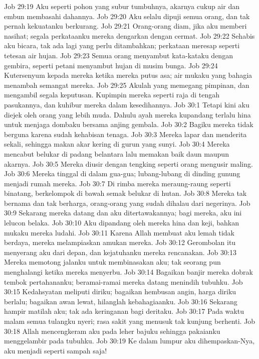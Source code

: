 Job 29:19  Aku seperti pohon yang subur tumbuhnya, akarnya cukup air dan embun membasahi dahannya.
Job 29:20  Aku selalu dipuji semua orang, dan tak pernah kekuatanku berkurang.
Job 29:21  Orang-orang diam, jika aku memberi nasihat; segala perkataanku mereka dengarkan dengan cermat.
Job 29:22  Sehabis aku bicara, tak ada lagi yang perlu ditambahkan; perkataan meresap seperti tetesan air hujan.
Job 29:23  Semua orang menyambut kata-kataku dengan gembira, seperti petani menyambut hujan di musim bunga.
Job 29:24  Kutersenyum kepada mereka ketika mereka putus asa; air mukaku yang bahagia menambah semangat mereka.
Job 29:25  Akulah yang memegang pimpinan, dan mengambil segala keputusan. Kupimpin mereka seperti raja di tengah pasukannya, dan kuhibur mereka dalam kesedihannya.
Job 30:1  Tetapi kini aku diejek oleh orang yang lebih muda. Dahulu ayah mereka kupandang terlalu hina untuk menjaga dombaku bersama anjing gembala.
Job 30:2  Bagiku mereka tidak berguna karena sudah kehabisan tenaga.
Job 30:3  Mereka lapar dan menderita sekali, sehingga makan akar kering di gurun yang sunyi.
Job 30:4  Mereka mencabut belukar di padang belantara lalu memakan baik daun maupun akarnya.
Job 30:5  Mereka diusir dengan tengking seperti orang mengusir maling.
Job 30:6  Mereka tinggal di dalam gua-gua; lubang-lubang di dinding gunung menjadi rumah mereka.
Job 30:7  Di rimba mereka meraung-raung seperti binatang, berkelompok di bawah semak belukar di hutan.
Job 30:8  Mereka tak bernama dan tak berharga, orang-orang yang sudah dihalau dari negerinya.
Job 30:9  Sekarang mereka datang dan aku ditertawakannya; bagi mereka, aku ini lelucon belaka.
Job 30:10  Aku dipandang oleh mereka hina dan keji, bahkan mukaku mereka ludahi.
Job 30:11  Karena Allah membuat aku lemah tidak berdaya, mereka melampiaskan amukan mereka.
Job 30:12  Gerombolan itu menyerang aku dari depan, dan kejatuhanku mereka rencanakan.
Job 30:13  Mereka memotong jalanku untuk membinasakan aku; tak seorang pun menghalangi ketika mereka menyerbu.
Job 30:14  Bagaikan banjir mereka dobrak tembok pertahananku; beramai-ramai mereka datang menindih tubuhku.
Job 30:15  Kedahsyatan meliputi diriku; bagaikan hembusan angin, harga diriku berlalu; bagaikan awan lewat, hilanglah kebahagiaanku.
Job 30:16  Sekarang hampir matilah aku; tak ada keringanan bagi deritaku.
Job 30:17  Pada waktu malam semua tulangku nyeri; rasa sakit yang menusuk tak kunjung berhenti.
Job 30:18  Allah mencengkeram aku pada leher bajuku sehingga pakaianku menggelambir pada tubuhku.
Job 30:19  Ke dalam lumpur aku dihempaskan-Nya, aku menjadi seperti sampah saja!

